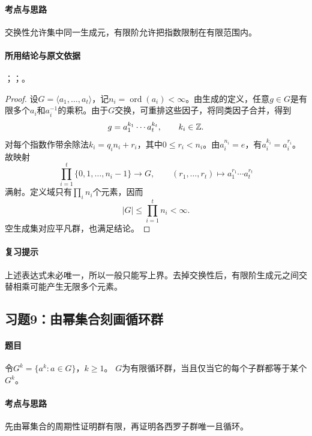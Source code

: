 \paragraph{考点与思路}
交换性允许集中同一生成元，有限阶允许把指数限制在有限范围内。

\paragraph{所用结论与原文依据}
；；。


\begin{proof}
设$G=\langle a_1,\ldots,a_t\rangle$，记$n_i=\operatorname{ord}(a_i)<\infty$。由生成的定义，任意$g\in G$是有限多个$a_i$和$a_i^{-1}$的乘积。由于$G$交换，可重排这些因子，将同类因子合并，得到
\[
g=a_1^{k_1}\cdots a_t^{k_t},\qquad k_i\in\mathbb Z.
\]
对每个指数作带余除法$k_i=q_in_i+r_i$，其中$0\le r_i<n_i$。由$a_i^{n_i}=e$，有$a_i^{k_i}=a_i^{r_i}$。故映射
\[
\prod_{i=1}^t\{0,1,\ldots,n_i-1\}\longrightarrow G,
\qquad(r_1,\ldots,r_t)\longmapsto a_1^{r_1}\cdots a_t^{r_t}
\]
满射。定义域只有$\prod_i n_i$个元素，因而
\[
|G|\le\prod_{i=1}^t n_i<\infty.
\]
空生成集对应平凡群，也满足结论。
\end{proof}

\paragraph{复习提示}
上述表达式未必唯一，所以一般只能写上界。去掉交换性后，有限阶生成元之间交替相乘可能产生无限多个元素。


\subsection{习题9：\texorpdfstring{由幂集合刻画循环群}{由幂集合刻画循环群}}
\label{ex:2:9}

\paragraph{题目}
令$G^k=\{a^k:a\in G\}$，$k\geq1$。
$G$为有限循环群，当且仅当它的每个子群都等于某个$G^k$。

\paragraph{考点与思路}
先由幂集合的周期性证明群有限，再证明各西罗子群唯一且循环。

